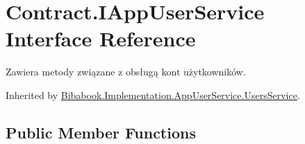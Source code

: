 \hypertarget{interface_contract_1_1_i_app_user_service}{}\section{Contract.\+I\+App\+User\+Service Interface Reference}
\label{interface_contract_1_1_i_app_user_service}


Zawiera metody związane z obsługą kont użytkowników.  




Inherited by \hyperlink{class_bibabook_1_1_implementation_1_1_app_user_service_1_1_users_service}{Bibabook.\+Implementation.\+App\+User\+Service.\+Users\+Service}.

\subsection*{Public Member Functions}
